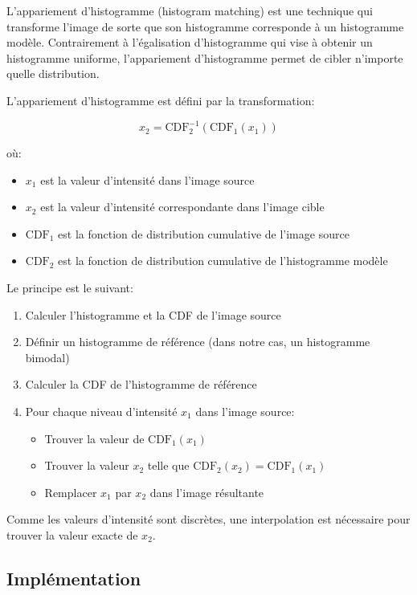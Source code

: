 \documentclass[12pt,a4paper]{article}
\begin{document}
L'appariement d'histogramme (histogram matching) est une technique qui transforme l'image de sorte que son histogramme corresponde à un histogramme modèle. Contrairement à l'égalisation d'histogramme qui vise à obtenir un histogramme uniforme, l'appariement d'histogramme permet de cibler n'importe quelle distribution.

L'appariement d'histogramme est défini par la transformation:

\begin{equation}
    x_2 = \text{CDF}_2^{-1}(\text{CDF}_1(x_1))
\end{equation}

où:
\begin{itemize}
    \item $x_1$ est la valeur d'intensité dans l'image source
    \item $x_2$ est la valeur d'intensité correspondante dans l'image cible
    \item $\text{CDF}_1$ est la fonction de distribution cumulative de l'image source
    \item $\text{CDF}_2$ est la fonction de distribution cumulative de l'histogramme modèle
\end{itemize}

Le principe est le suivant:
\begin{enumerate}
    \item Calculer l'histogramme et la CDF de l'image source
    \item Définir un histogramme de référence (dans notre cas, un histogramme bimodal)
    \item Calculer la CDF de l'histogramme de référence
    \item Pour chaque niveau d'intensité $x_1$ dans l'image source:
    \begin{itemize}
        \item Trouver la valeur de $\text{CDF}_1(x_1)$
        \item Trouver la valeur $x_2$ telle que $\text{CDF}_2(x_2) = \text{CDF}_1(x_1)$
        \item Remplacer $x_1$ par $x_2$ dans l'image résultante
    \end{itemize}
\end{enumerate}

Comme les valeurs d'intensité sont discrètes, une interpolation est nécessaire pour trouver la valeur exacte de $x_2$.

\subsection{Implémentation}
\end{document}
